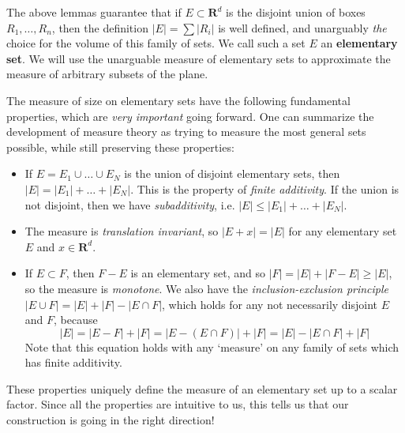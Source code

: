 %


%

The above lemmas guarantee that if $E \subset \mathbf{R}^d$ is the disjoint union of boxes $R_1, \dots, R_n$, then the definition $|E| = \sum |R_i|$ is well defined, and unarguably {\it the} choice for the volume of this family of sets. We call such a set $E$ an {\bf elementary set}. We will use the unarguable measure of elementary sets to approximate the measure of arbitrary subsets of the plane.

The measure of size on elementary sets have the following fundamental properties, which are {\it very important} going forward. One can summarize the development of measure theory as trying to measure the most general sets possible, while still preserving these properties:
%
\begin{itemize}
    \item If $E = E_1 \cup \dots \cup E_N$ is the union of disjoint elementary sets, then $|E| = |E_1| + \dots + |E_N|$. This is the property of {\it finite additivity}. If the union is not disjoint, then we have {\it subadditivity}, i.e. $|E| \leq |E_1| + \dots + |E_N|$.

  \item The measure is {\it translation invariant}, so $|E + x| = |E|$ for any elementary set $E$ and $x \in \mathbf{R}^d$.

  \item If $E \subset F$, then $F - E$ is an elementary set, and so $|F| = |E| + |F - E| \geq |E|$, so the measure is {\it monotone}. We also have the {\it inclusion-exclusion principle} $|E \cup F| = |E| + |F| - |E \cap F|$, which holds for any not necessarily disjoint $E$ and $F$, because
  \[ |E| = |E - F| + |F| = |E - (E \cap F)| + |F| = |E| - |E \cap F| + |F| \]
  Note that this equation holds with any `measure' on any family of sets which has finite additivity.
\end{itemize}
%
These properties uniquely define the measure of an elementary set up to a scalar factor. Since all the properties are intuitive to us, this tells us that our construction is going in the right direction!

